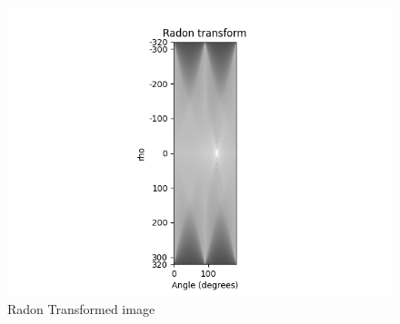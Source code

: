 \begin{figure}[htbp]
    \centering
	\includegraphics[width=\textwidth]{../images/p4/p4b_radon.png}
    \caption{Radon Transformed image}
    \label{fig:p4b}
\end{figure}

